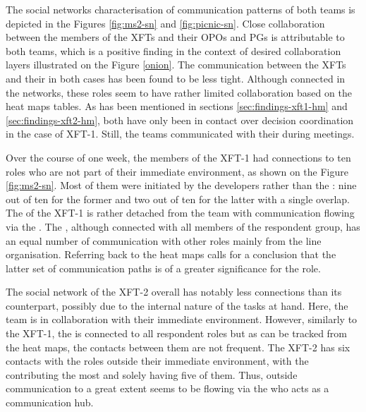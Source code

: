 The social networks characterisation of communication patterns of both teams is depicted in the Figures \ref{fig:ms2-sn} and \ref{fig:picnic-sn}. Close collaboration between the members of the \acp{XFT} and their \acp{OPO} and \acp{PG} is attributable to both teams, which is a positive finding in the context of desired collaboration layers illustrated on the Figure \ref{onion}. The communication between the \acp{XFT} and their  in both cases has been found to be less tight. Although connected in the networks, these roles seem to have rather limited collaboration based on the heat maps tables. As has been mentioned in sections \ref{sec:findings-xft1-hm} and \ref{sec:findings-xft2-hm}, both have only been in contact over decision coordination in the case of \ac{XFT}-1. Still, the teams communicated with their  during meetings.

Over the course of one week, the members of the \ac{XFT}-1 had connections to ten roles who are not part of their immediate environment, as shown on the Figure \ref{fig:ms2-sn}. Most of them were initiated by the developers rather than the : nine out of ten for the former and two out of ten for the latter with a single overlap. The  of the \ac{XFT}-1 is rather detached from the team with communication flowing via the . The , although connected with all members of the respondent group, has an equal number of communication with other roles mainly from the line organisation. Referring back to the heat maps calls for a conclusion that the latter set of communication paths is of a greater significance for the role.

The social network of the \ac{XFT}-2 overall has notably less connections than its counterpart, possibly due to the internal nature of the tasks at hand. Here, the team is in collaboration with their immediate environment. However, similarly to the \ac{XFT}-1, the  is connected to all respondent roles but as can be tracked from the heat maps, the contacts between them are not frequent. The \ac{XFT}-2 has six contacts with the roles outside their immediate environment, with the  contributing the most and solely having five of them. Thus, outside communication to a great extent seems to be flowing via the  who acts as a communication hub.

